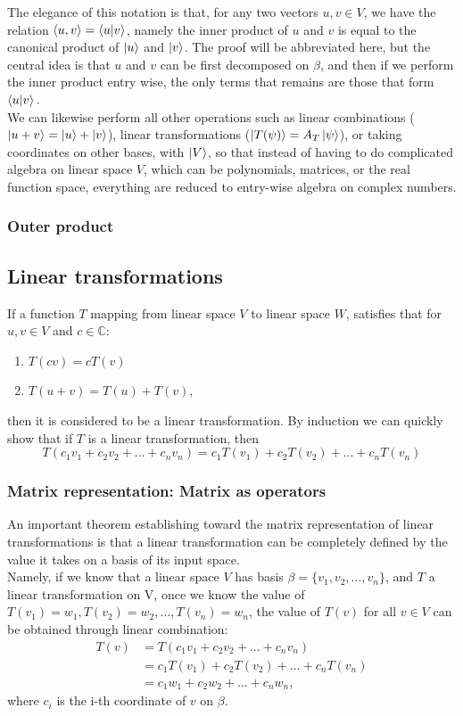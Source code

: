 \documentclass[12pt]{article}
\begin{document}
\noindent The elegance of this notation is that, for any two vectors $u,v\in V$, we have the relation $\left<u,v\right>=\braket{u}{v}$, namely the inner product of $u$ and $v$ is equal to the canonical product of $\ket{u}$ and $\ket{v}$. The proof will be abbreviated here, but the central idea is that $u$ and $v$ can be first decomposed on $\beta$, and then if we perform the inner product entry wise, the only terms that remains are those that form $\braket{u}{v}.$ \\

\noindent We can likewise perform all other operations such as linear combinations ($\ket{u+v}=\ket{u}+\ket{v}$), linear transformations ($\ket{T(\psi)}=A_T\ket{\psi}$), or taking coordinates on other bases,  with $\ket{V}$, so that instead of having to do complicated algebra on linear space $V$, which can be polynomials, matrices, or the real function space, everything are reduced to entry-wise algebra on complex numbers.
\subsubsection{Outer product}

\subsection{Linear transformations}
If a function $T$ mapping from linear space $V$ to linear space $W$, satisfies that for $u, v\in V$ and $c\in \mathbb{C}$:
\begin{enumerate}
    \item $T(cv)=cT(v)$
    \item $T(u+v)=T(u)+T(v)$,
\end{enumerate}
then it is considered to be a linear transformation. By induction we can quickly show that if $T$ is a linear transformation, then $$T(c_1v_1+c_2v_2+...+c_nv_n)=c_1T(v_1)+c_2T(v_2)+...+c_nT(v_n)$$ 
\subsubsection{Matrix representation: Matrix as operators}
An important theorem establishing toward the matrix representation of linear transformations is that a linear transformation can be completely defined by the value it takes on a basis of its input space.\\ Namely, if we know that a linear space $V$ has basis $\beta=\{v_1, v_2, ..., v_n\}$, and $T$ a linear transformation on V, once we know the value of $T(v_1)=w_1, T(v_2)=w_2,...,T(v_n)=w_n$, the value of $T(v)$ for all $v\in V$ can be obtained through linear combination:
\begin{align*}
    T(v)&=T(c_1v_1+c_2v_2+...+c_nv_n)\\
    &=c_1T(v_1)+c_2T(v_2)+...+c_nT(v_n)\\
    &=c_1w_1+c_2w_2+...+c_nw_n,
\end{align*}
where $c_i$ is the i-th coordinate of $v$ on $\beta$.\\
\end{document}
